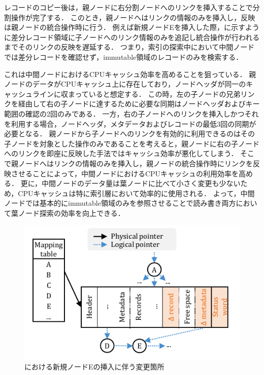 レコードのコピー後は，親ノードに右分割ノードへのリンクを挿入することで分割操作が完了する．
このとき，親ノードへはリンクの情報のみを挿入し，反映は親ノードの統合操作時に行う．
例えば新規ノードEを挿入した際，\Fig{\ref{fig:bc_tree_inner_nodes}}に示すように差分レコード領域に子ノードへのリンク情報のみを追記し統合操作が行われるまでそのリンクの反映を遅延する．
つまり，索引の探索中において中間ノードでは差分レコードを確認せず，immutable領域のレコードのみを検索する．

これは中間ノードにおけるCPUキャッシュ効率を高めることを狙っている．
親ノードのデータがCPUキャッシュ上に存在しており，ノードヘッダが同一のキャッシュラインに収まっていると想定する．
この時，左の子ノードの兄弟リンクを経由して右の子ノードに達するために必要な同期はノードヘッダおよびキー範囲の確認の2回のみである．
一方，右の子ノードへのリンクを挿入しかつそれを利用する場合，ノードヘッダ，メタデータおよびレコードの最低3回の同期が必要となる．
親ノードから子ノードへのリンクを有効的に利用できるのはその子ノードを対象とした操作のみであることを考えると，親ノードに右の子ノードへのリンクを即座に反映した手法ではキャッシュ効率が悪化してしまう．
そこで親ノードへはリンクの情報のみを挿入し，親ノードの統合操作時にリンクを反映させることによって，中間ノードにおけるCPUキャッシュの利用効率を高める．
更に，中間ノードのデータ量は葉ノードに比べて小さく変更も少ないため，CPUキャッシュは特に索引層において効率的に使用される．
よって，中間ノードでは基本的にimmutable領域のみを参照させることで読み書き両方において葉ノード探索の効率を向上できる．

\begin{figure}[t]
    \centering
    \includegraphics{./figures/Bc-inner_nodes.pdf}
    \caption{\Bctree{}における新規ノードEの挿入に伴う変更箇所}
    \label{fig:bc_tree_inner_nodes}
\end{figure}

